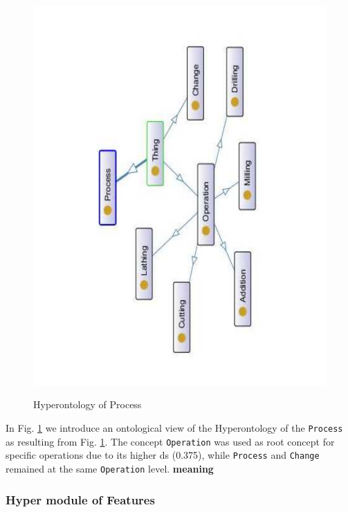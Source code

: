 \begin{figure}
\begin{minipage}{.5\textwidth}
		\includegraphics[scale=0.35, angle=270]{figure-chapterIV/fig4-21}\\
		\caption{Hyperontology of Process}
		\label{figure4-21}
	\end{minipage}%
\end{figure}



In Fig. \ref{figure4-21} we introduce an ontological view of the Hyperontology of the \texttt{Process} as resulting from Fig. \ref{figure4-21}. The concept \texttt{Operation} was used as root concept for specific operations due to its higher \gls{ds} (0.375), while \texttt{Process} and \texttt{Change} remained  at the same \texttt{Operation} level. \textbf{meaning}

\subsubsection{Hyper module of Features}\label{subsubsection4.2.5.4}


